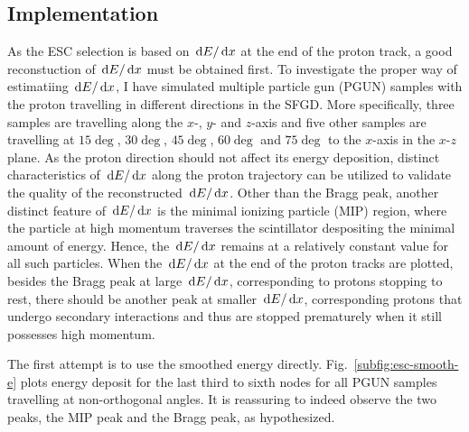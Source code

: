    \subsection{Implementation}
   As the ESC selection is based on $\,\textrm{d}E/\,\textrm{d}x$ at the end of the proton track, a good reconstuction of $\,\textrm{d}E/\,\textrm{d}x$ must be obtained first.
   To investigate the proper way of estimatiing $\,\textrm{d}E/\,\textrm{d}x$, I have simulated multiple particle gun (PGUN) samples with the proton travelling in different directions in the SFGD.
   More specifically, three samples are travelling along the $x$-, $y$- and $z$-axis and five other samples are travelling at $15\deg$, $30\deg$, $45\deg$, $60\deg$ and $75\deg$ to the $x$-axis in the $x$-$z$ plane.
   As the proton direction should not affect its energy deposition, distinct characteristics of $\,\textrm{d}E/\,\textrm{d}x$ along the proton trajectory can be utilized to validate the quality of the reconstructed $\,\textrm{d}E/\,\textrm{d}x$.
   Other than the Bragg peak, another distinct feature of $\,\textrm{d}E/\,\textrm{d}x$ is the minimal ionizing particle (MIP) region, where the particle at high momentum traverses the scintillator despositing the minimal amount of energy. 
   Hence, the $\,\textrm{d}E/\,\textrm{d}x$ remains at a relatively constant value for all such particles.
   When the $\,\textrm{d}E/\,\textrm{d}x$ at the end of the proton tracks are plotted, besides the Bragg peak at large $\,\textrm{d}E/\,\textrm{d}x$, corresponding to protons stopping to rest, there should be another peak at smaller $\,\textrm{d}E/\,\textrm{d}x$, corresponding protons that undergo secondary interactions and thus are stopped prematurely when it still possesses high momentum.

   The first attempt is to use the smoothed energy directly. 
   Fig.~\ref{subfig:esc-smooth-e} plots energy deposit for the last third to sixth nodes for all PGUN samples travelling at non-orthogonal angles.
   It is reassuring to indeed observe the two peaks, the MIP peak and the Bragg peak, as hypothesized. 

